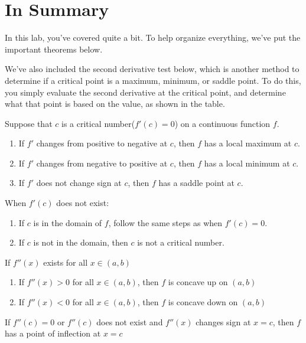 \documentclass{ximera}
\begin{document}
\section{In Summary}
In this lab, you've covered quite a bit. To help organize everything, we've put the important theorems below.

We've also included the second derivative test below, which is another method to determine if a critical point is a maximum, minimum, or saddle point. To do this, you simply evaluate the second derivative at the critical point, and determine what that point is based on the value, as shown in the table.

\begin{theorem}
Suppose that $c$ is a critical number($f'(c)=0$) on a continuous function $f$.
\begin{enumerate}
\item If $f'$ changes from positive to negative at $c$, then $f$ has a local maximum at $c$.
\item If $f'$ changes from negative to positive at $c$, then $f$ has a local minimum at $c$.
\item If $f'$ does not change sign at $c$, then $f$ has a saddle point at $c$.
\end{enumerate}
\begin{remark}
When $f'(c)$ does not exist:
\begin{enumerate}
\item{If $c$ is in the domain of $f$, follow the same steps as when $f'(c)=0\text{.}$}
\item{If $c$ is not in the domain, then $c$ is not a critical number.}
\end{enumerate}
\end{remark}
\end{theorem}

\begin{theorem}
If $f''(x)$ exists for all $x\in(a,b)$ 
\begin{enumerate}
\item{If $f''(x)>0$ for all $x\in(a,b)$, then $f$ is concave up on $(a,b)$}
\item{If $f''(x)<0$ for all $x\in(a,b)$, then $f$ is concave down on $(a,b)$}
\end{enumerate}
\end{theorem}

\begin{theorem}
If $f''(c)=0$ or $f''(c)$ does not exist and $f''(x)$ changes sign at $x=c$, then $f$ has a point of inflection at $x=c$
\end{theorem}
\end{document}
